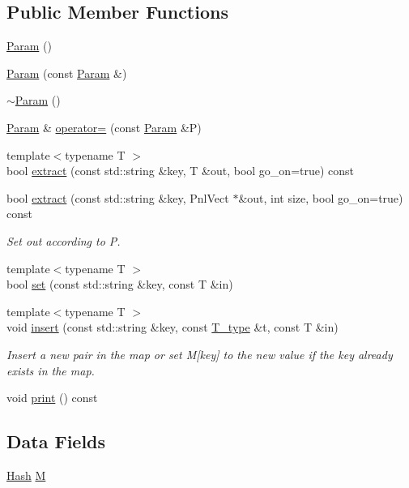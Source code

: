\subsection*{Public Member Functions}
\begin{DoxyCompactItemize}
\item 
\hyperlink{classParam_ae0eeef2ab32df12ccc4e9d2174d6e91a}{Param} ()
\item 
\hyperlink{classParam_a37fea09e1a1e9b563d9a99ae07651cfc}{Param} (const \hyperlink{classParam}{Param} \&)
\item 
\hyperlink{classParam_a63814ed15af3910f8899dbd6853a7e05}{$\sim$\-Param} ()
\item 
\hyperlink{classParam}{Param} \& \hyperlink{classParam_a4379b839d0232f2be88cb0f0ea22e764}{operator=} (const \hyperlink{classParam}{Param} \&P)
\item 
{\footnotesize template$<$typename T $>$ }\\bool \hyperlink{classParam_ac6c8cda9e2a70f76b6fb68434ade63a7}{extract} (const std\-::string \&key, T \&out, bool go\-\_\-on=true) const 
\item 
bool \hyperlink{classParam_a4747df3d3a71c4ba0903021f53852a51}{extract} (const std\-::string \&key, Pnl\-Vect $\ast$\&out, int size, bool go\-\_\-on=true) const 
\begin{DoxyCompactList}\small\item\em Set out according to P. \end{DoxyCompactList}\item 
{\footnotesize template$<$typename T $>$ }\\bool \hyperlink{classParam_a6e7845fcfd27605274ea017b27122344}{set} (const std\-::string \&key, const T \&in)
\item 
{\footnotesize template$<$typename T $>$ }\\void \hyperlink{classParam_a2d37d55e8112a67ac0fdbd719b141837}{insert} (const std\-::string \&key, const \hyperlink{parser_8hpp_a90856b8fb3f1a65845ffec1ec2884c0f}{T\-\_\-type} \&t, const T \&in)
\begin{DoxyCompactList}\small\item\em Insert a new pair in the map or set M\mbox{[}key\mbox{]} to the new value if the key already exists in the map. \end{DoxyCompactList}\item 
void \hyperlink{classParam_a05fdfe029c450d1607e64cda216ed7ac}{print} () const 
\end{DoxyCompactItemize}
\subsection*{Data Fields}
\begin{DoxyCompactItemize}
\item 
\hyperlink{parser_8hpp_a77c3bfcf208503ef5164669afcd00ffe}{Hash} \hyperlink{classParam_ab671c1688f5247604d23ed990c90fd36}{M}
\end{DoxyCompactItemize}
